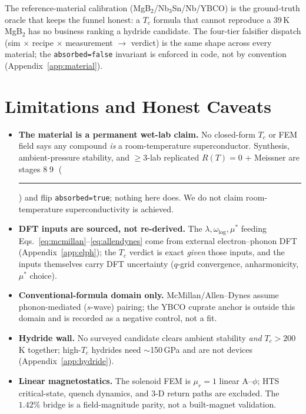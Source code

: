 \documentclass[11pt,a4paper]{article}
\newcommand{\tierdisc}[1]{\textcolor{#1}{\rule[0.05ex]{1.0ex}{1.0ex}}}
\newcommand{\tierOrange}{\tierdisc{orange!90!black}}
\begin{document}
The reference-material calibration (MgB$_2$/Nb$_3$Sn/Nb/YBCO) is the
ground-truth oracle that keeps the funnel honest: a $T_c$ formula that
cannot reproduce a 39\,K MgB$_2$ has no business ranking a hydride
candidate. The four-tier falsifier dispatch
(sim $\times$ recipe $\times$ measurement $\to$ verdict) is the same
shape across every material; the \texttt{absorbed=false} invariant is
enforced in code, not by convention (Appendix~\ref{app:material}).

\section{Limitations and Honest Caveats}
\label{sec:limits}

\begin{itemize}\itemsep0.3em
\item \textbf{The material is a permanent wet-lab claim.} No
  closed-form $T_c$ or FEM field says any compound \emph{is} a
  room-temperature superconductor. Synthesis, ambient-pressure
  stability, and $\ge\!3$-lab replicated $R(T)\!=\!0$ + Meissner are
  stages \textcircled{\scriptsize 8}\textcircled{\scriptsize 9}
  (\tierOrange) and flip \texttt{absorbed=true}; nothing here does. We
  do not claim room-temperature superconductivity is achieved.
\item \textbf{DFT inputs are sourced, not re-derived.} The
  $\lambda,\omega_{\log},\mu^{*}$ feeding Eqs.~\eqref{eq:mcmillan}--\eqref{eq:allendynes}
  come from external electron--phonon DFT
  (Appendix~\ref{app:elph}); the $T_c$ verdict is exact \emph{given}
  those inputs, and the inputs themselves carry DFT uncertainty
  ($q$-grid convergence, anharmonicity, $\mu^{*}$ choice).
\item \textbf{Conventional-formula domain only.} McMillan/Allen--Dynes
  assume phonon-mediated ($s$-wave) pairing; the YBCO cuprate anchor is
  outside this domain and is recorded as a negative control, not a fit.
\item \textbf{Hydride wall.} No surveyed candidate clears ambient
  stability \emph{and} $T_c\!>\!200$\,K together; high-$T_c$ hydrides
  need $\sim$150\,GPa and are not devices (Appendix~\ref{app:hydride}).
\item \textbf{Linear magnetostatics.} The solenoid FEM is
  $\mu_r\!=\!1$ linear A--$\phi$; HTS critical-state, quench dynamics,
  and 3-D return paths are excluded. The $1.42\%$ bridge is a
  field-magnitude parity, not a built-magnet validation.
\end{itemize}
\end{document}
